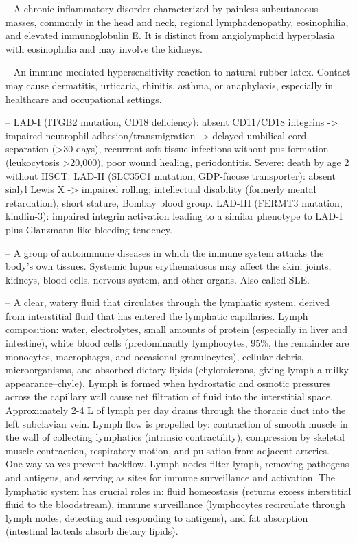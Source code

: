 -- A chronic inflammatory disorder characterized by painless subcutaneous masses, commonly in the head and neck, regional lymphadenopathy, eosinophilia, and elevated immunoglobulin E. It is distinct from angiolymphoid hyperplasia with eosinophilia and may involve the kidneys.

-- An immune-mediated hypersensitivity reaction to natural rubber latex. Contact may cause dermatitis, urticaria, rhinitis, asthma, or anaphylaxis, especially in healthcare and occupational settings.

-- LAD-I (ITGB2 mutation, CD18 deficiency): absent CD11/CD18 integrins -> impaired neutrophil adhesion/transmigration -> delayed umbilical cord separation (>30 days), recurrent soft tissue infections without pus formation (leukocytosis >20,000), poor wound healing, periodontitis. Severe: death by age 2 without HSCT. LAD-II (SLC35C1 mutation, GDP-fucose transporter): absent sialyl Lewis X -> impaired rolling; intellectual disability (formerly mental retardation), short stature, Bombay blood group. LAD-III (FERMT3 mutation, kindlin-3): impaired integrin activation leading to a similar phenotype to LAD-I plus Glanzmann-like bleeding tendency.

-- A group of autoimmune diseases in which the immune system attacks the body's own tissues. Systemic lupus erythematosus may affect the skin, joints, kidneys, blood cells, nervous system, and other organs. Also called SLE.

-- A clear, watery fluid that circulates through the lymphatic system, derived from interstitial fluid that has entered the lymphatic capillaries. Lymph composition: water, electrolytes, small amounts of protein (especially in liver and intestine), white blood cells (predominantly lymphocytes, 95\%, the remainder are monocytes, macrophages, and occasional granulocytes), cellular debris, microorganisms, and absorbed dietary lipids (chylomicrons, giving lymph a milky appearance--chyle). Lymph is formed when hydrostatic and osmotic pressures across the capillary wall cause net filtration of fluid into the interstitial space. Approximately 2-4 L of lymph per day drains through the thoracic duct into the left subclavian vein. Lymph flow is propelled by: contraction of smooth muscle in the wall of collecting lymphatics (intrinsic contractility), compression by skeletal muscle contraction, respiratory motion, and pulsation from adjacent arteries. One-way valves prevent backflow. Lymph nodes filter lymph, removing pathogens and antigens, and serving as sites for immune surveillance and activation. The lymphatic system has crucial roles in: fluid homeostasis (returns excess interstitial fluid to the bloodstream), immune surveillance (lymphocytes recirculate through lymph nodes, detecting and responding to antigens), and fat absorption (intestinal lacteals absorb dietary lipids).

